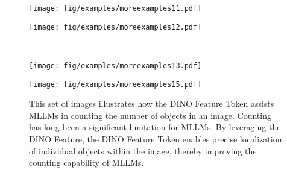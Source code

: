 \vspace{0pt}
\begin{figure*}[h]
\vspace{0pt}
  \centering
    \begin{minipage}[t]{0.45\textwidth}
        \centering
        \vspace{0pt}
        \texttt{[image: fig/examples/moreexamples11.pdf]}
    \end{minipage}
    \hfill
    \begin{minipage}[t]{0.45\textwidth}
        \centering
        \vspace{0pt}
        \texttt{[image: fig/examples/moreexamples12.pdf]}
    \end{minipage}
    \\
    \begin{minipage}[t]{0.45\textwidth}
        \centering
        \vspace{0pt}
        \texttt{[image: fig/examples/moreexamples13.pdf]}
    \end{minipage}
    \hfill
    \begin{minipage}[t]{0.45\textwidth}
        \centering
        \vspace{0pt}
        \texttt{[image: fig/examples/moreexamples15.pdf]}
    \end{minipage}
   \caption{This set of images illustrates how the DINO Feature Token assists MLLMs in counting the number of objects in an image. Counting has long been a significant limitation for MLLMs. By leveraging the DINO Feature, the DINO Feature Token enables precise localization of individual objects within the image, thereby improving the counting capability of MLLMs.}
   \label{fig:moreexample:g4}
\end{figure*}
\textcolor{white}{empty}